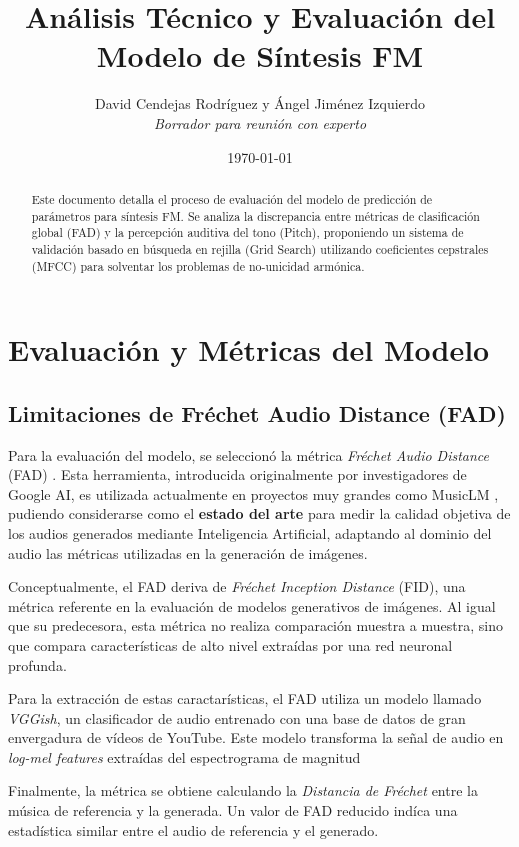 \documentclass[12pt, a4paper]{article}
\title{\textbf{Análisis Técnico y Evaluación del Modelo de Síntesis FM}}
\author{David Cendejas Rodríguez y Ángel Jiménez Izquierdo \\ \textit{Borrador para reunión con experto}}
\date{\today}
\begin{document}
\maketitle

\begin{abstract}
Este documento detalla el proceso de evaluación del modelo de predicción de parámetros para síntesis FM. Se analiza la discrepancia entre métricas de clasificación global (FAD) y la percepción auditiva del tono (Pitch), proponiendo un sistema de validación basado en búsqueda en rejilla (Grid Search) utilizando coeficientes cepstrales (MFCC) para solventar los problemas de no-unicidad armónica.

\end{abstract}

\tableofcontents
\newpage

\section{Evaluación y Métricas del Modelo}


\subsection{Limitaciones de Fréchet Audio Distance (FAD)}
Para la evaluación del modelo, se seleccionó la métrica \textit{Fréchet Audio Distance} (FAD) \cite{kilgour2019}. 
Esta herramienta, introducida originalmente por investigadores de Google AI, es utilizada actualmente en proyectos muy grandes como 
MusicLM \cite{agostinelli2023}, pudiendo considerarse como el \textbf{estado del arte} para medir la calidad objetiva de los audios generados mediante Inteligencia Artificial, adaptando al dominio del audio las métricas utilizadas en la generación de imágenes.

Conceptualmente, el FAD deriva de \textit{Fréchet Inception Distance} (FID), una métrica referente en la evaluación de modelos generativos de imágenes.
Al igual que su predecesora, esta métrica no realiza comparación muestra a muestra, sino que compara características de alto nivel extraídas por una red neuronal profunda.

Para la extracción de estas caractarísticas, el FAD utiliza un modelo llamado \textit{VGGish}, un clasificador de audio entrenado con una base de datos 
de gran envergadura de vídeos de YouTube. Este modelo transforma la señal de audio en \textit{log-mel features} extraídas del espectrograma de magnitud

Finalmente, la métrica se obtiene calculando la \textit{Distancia de Fréchet} entre la música de referencia y la generada. Un valor de FAD reducido indíca una estadística similar entre el audio de referencia y el generado.
\end{document}
